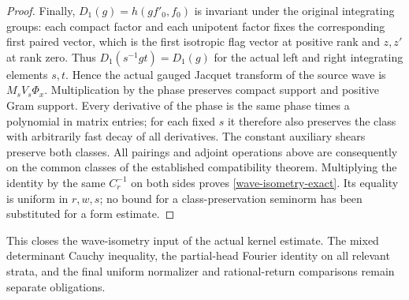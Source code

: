 \begin{proof}
Finally, $D_1(g)=h(gf'_0,f_0)$ is invariant under the original
integrating groups: each compact factor and each unipotent factor
fixes the corresponding first paired vector, which is the first
isotropic flag vector at positive rank and $z,z'$ at rank zero.
Thus $D_1(s^{-1}gt)=D_1(g)$ for the actual left and right
integrating elements $s,t$.  Hence the actual gauged Jacquet transform of the source
wave is $M_sV_s\Phi_x$.  Multiplication by the phase preserves
compact support and positive Gram support.  Every derivative of
the phase is the same phase times a polynomial in matrix entries;
for each fixed $s$ it therefore also preserves the class with
arbitrarily fast decay of all derivatives.  The constant auxiliary
shears preserve both classes.  All pairings and adjoint operations
above are consequently on the common classes of the established
compatibility theorem.  Multiplying the identity by the same
$C_r^{-1}$ on both sides proves \eqref{wave-isometry-exact}.
Its equality is uniform in $r,w,s$; no bound for a class-preservation
seminorm has been substituted for a form estimate.
\end{proof}

This closes the wave-isometry input of the actual kernel estimate.
The mixed determinant Cauchy inequality, the partial-head Fourier
identity on all relevant strata, and the final uniform normalizer
and rational-return comparisons remain separate obligations.

